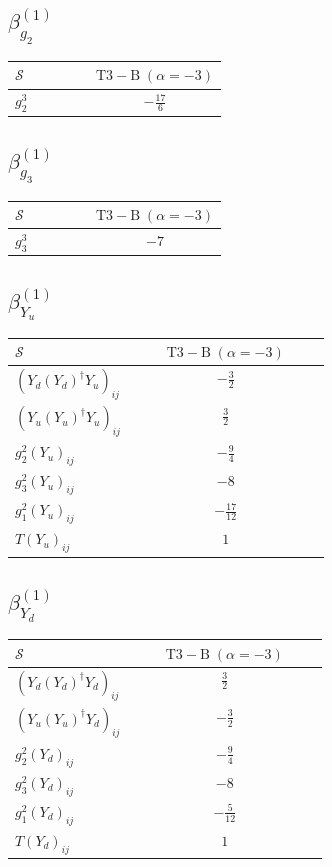 \documentclass[9pt]{article}
\begin{document}
\subsection*{$ \beta_{g_2}^{(1)} $}
\begin{longtable}{@{}p{0.38\linewidth}c@{}}
\toprule
$\mathcal{S}$ & $ \mathrm{T3-B}\;(\alpha=-3) $ \\
\midrule
$ g_2^3 $ & $ - \frac{17}{6} $ \\
\bottomrule
\end{longtable}
\subsection*{$ \beta_{g_3}^{(1)} $}
\begin{longtable}{@{}p{0.38\linewidth}c@{}}
\toprule
$\mathcal{S}$ & $ \mathrm{T3-B}\;(\alpha=-3) $ \\
\midrule
$ g_3^3 $ & $ -7 $ \\
\bottomrule
\end{longtable}
\subsection*{$ \beta_{Y_u}^{(1)} $}
\begin{longtable}{@{}p{0.38\linewidth}c@{}}
\toprule
$\mathcal{S}$ & $ \mathrm{T3-B}\;(\alpha=-3) $ \\
\midrule
$ (Y_d (Y_d)^{\dagger} Y_u)_{ij} $ & $ - \frac{3}{2} $ \\
$ (Y_u (Y_u)^{\dagger} Y_u)_{ij} $ & $ \frac{3}{2} $ \\
$ g_2^2 (Y_u)_{ij} $ & $ - \frac{9}{4} $ \\
$ g_3^2 (Y_u)_{ij} $ & $ -8 $ \\
$ g_1^2 (Y_u)_{ij} $ & $ - \frac{17}{12} $ \\
$ T (Y_u)_{ij} $ & $ 1 $ \\
\bottomrule
\end{longtable}
\subsection*{$ \beta_{Y_d}^{(1)} $}
\begin{longtable}{@{}p{0.38\linewidth}c@{}}
\toprule
$\mathcal{S}$ & $ \mathrm{T3-B}\;(\alpha=-3) $ \\
\midrule
$ (Y_d (Y_d)^{\dagger} Y_d)_{ij} $ & $ \frac{3}{2} $ \\
$ (Y_u (Y_u)^{\dagger} Y_d)_{ij} $ & $ - \frac{3}{2} $ \\
$ g_2^2 (Y_d)_{ij} $ & $ - \frac{9}{4} $ \\
$ g_3^2 (Y_d)_{ij} $ & $ -8 $ \\
$ g_1^2 (Y_d)_{ij} $ & $ - \frac{5}{12} $ \\
$ T (Y_d)_{ij} $ & $ 1 $ \\
\bottomrule
\end{longtable}
\end{document}
